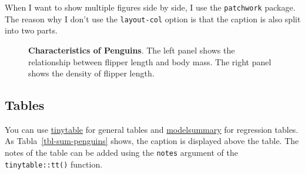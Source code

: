 \documentclass[
  12pt,
  letterpaper,
]{article}
\begin{document}
When I want to show multiple figures side by side, I use the
\texttt{patchwork} package. The reason why I don't use the
\texttt{layout-col} option is that the caption is also split into two
parts.

\begin{figure}[!t]


\caption{\label{fig-patchwork}\textbf{Characteristics of Penguins}. The
left panel shows the relationship between flipper length and body mass.
The right panel shows the density of flipper length.}

\end{figure}%

\subsection{Tables}\label{tables}

You can use
\href{https://vincentarelbundock.github.io/tinytable/}{tinytable} for
general tables and
\href{https://vincentarelbundock.github.io/modelsummary/}{modelsummary}
for regression tables. As Tabla~\ref{tbl-sum-penguins} shows, the
caption is displayed above the table. The notes of the table can be
added using the \texttt{notes} argument of the \texttt{tinytable::tt()}
function.
\end{document}
